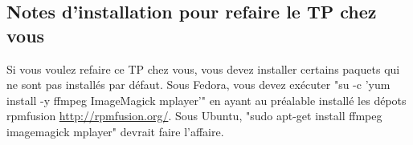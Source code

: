 \subsection{Notes d'installation pour refaire le TP chez vous}

Si vous voulez refaire ce TP chez vous, vous devez installer certains paquets qui ne sont pas installés par défaut. Sous Fedora, vous devez exécuter "su -c 'yum install -y ffmpeg ImageMagick mplayer'" en ayant au préalable installé les dépots rpmfusion \url{http://rpmfusion.org/}. Sous Ubuntu, "sudo apt-get install ffmpeg imagemagick mplayer" devrait faire l'affaire.


\vfill
\newpage
